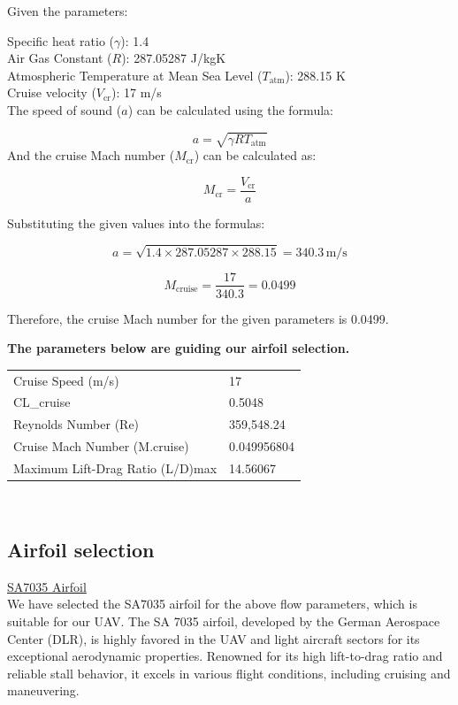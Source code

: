 \documentclass[12 pt]{article}
\begin{document}
\begin{itemize}
Given the parameters:

 Specific heat ratio (\( \gamma \)): 1.4\\
 Air Gas Constant (\( R \)): 287.05287 J/kgK\\
 Atmospheric Temperature at Mean Sea Level (\( T_{\text{atm}} \)): 288.15 K\\
 Cruise velocity (\( V_{\text{cr}} \)): 17 m/s\\

The speed of sound (\( a \)) can be calculated using the formula:

\[
a = \sqrt{\gamma R T_{\text{atm}}} \tag{6.4}
\]
And the cruise Mach number (\( M_{\text{cr}} \)) can be calculated as:

\[
M_{\text{cr}} = \frac{V_{\text{cr}}}{a} \tag{6.5}
\]

Substituting the given values into the formulas:

\[
a = \sqrt{1.4 \times 287.05287 \times 288.15}  = 340.3 \, \text{m/s}
\]

\[
M_{\text{cruise}} = \frac{17}{340.3} = 0.0499 \tag{6.6}
\]

Therefore, the cruise Mach number for the given parameters is  0.0499.
\end{itemize}
\color{black}
\textbf{ \large The parameters below are guiding our airfoil selection.}
\begin{table}[h]
\centering
\begin{tabular}{ll}
\hline
Cruise Speed (m/s) & 17 \\
CL\_cruise & 0.5048 \\
Reynolds Number (Re) & 359,548.24 \\
Cruise Mach Number (M.cruise) & 0.049956804 \\
Maximum Lift-Drag Ratio (L/D)max & 14.56067 \\
\hline
\end{tabular}
\end{table}\\
\color{red}
\subsection{ Airfoil selection}

 \large \underline{SA7035 Airfoil}\\
\color{black}
We have selected the SA7035 airfoil for the above flow parameters, which is suitable for our UAV. The SA 7035 airfoil, developed by the German Aerospace Center (DLR), is highly favored in the UAV and light aircraft sectors for its exceptional aerodynamic properties. Renowned for its high lift-to-drag ratio and reliable stall behavior, it excels in various flight conditions, including cruising and maneuvering.
\end{document}
